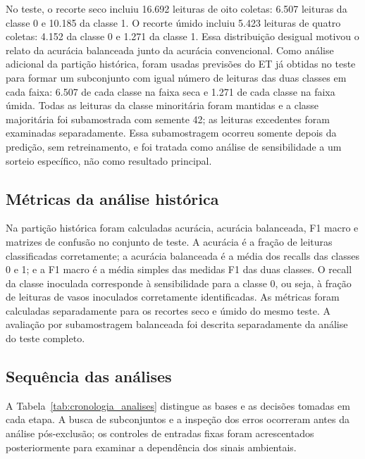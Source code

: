 No teste, o recorte seco incluiu 16.692 leituras de oito coletas: 6.507
leituras da classe 0 e 10.185 da classe 1. O recorte úmido incluiu 5.423
leituras de quatro coletas: 4.152 da classe 0 e 1.271 da classe 1. Essa
distribuição desigual motivou o relato da acurácia balanceada junto da
acurácia convencional. Como análise adicional da partição histórica,
foram usadas previsões do ET já obtidas no teste para formar um subconjunto
com igual número de leituras das duas classes em cada faixa: 6.507 de
cada classe na faixa seca e 1.271 de cada classe na faixa úmida. Todas
as leituras da classe minoritária foram mantidas e a classe majoritária
foi subamostrada com semente 42; as leituras excedentes foram examinadas
separadamente. Essa subamostragem ocorreu somente depois da predição,
sem retreinamento, e foi tratada como análise de sensibilidade a um
sorteio específico, não como resultado principal.

\subsection{Métricas da análise histórica}
\label{subsec:metricas}

Na partição histórica foram calculadas acurácia, acurácia balanceada,
F1 macro e matrizes de confusão no conjunto de teste. A acurácia é a
fração de leituras
classificadas corretamente; a acurácia balanceada é a média dos recalls
das classes 0 e 1; e a F1 macro é a média simples das medidas F1 das duas
classes. O recall da classe inoculada corresponde à sensibilidade
para a classe 0, ou seja, à fração de leituras de vasos inoculados
corretamente identificadas. As métricas foram calculadas separadamente
para os recortes seco e úmido do mesmo teste. A avaliação por
subamostragem balanceada foi descrita separadamente da análise do teste
completo.

\subsection{Sequência das análises}
\label{subsec:sequencia_analises}

A Tabela~\ref{tab:cronologia_analises} distingue as bases e as decisões
tomadas em cada etapa. A busca de subconjuntos e a inspeção dos erros
ocorreram antes da análise pós-exclusão; os controles de entradas fixas
foram acrescentados posteriormente para examinar a dependência dos
sinais ambientais.


